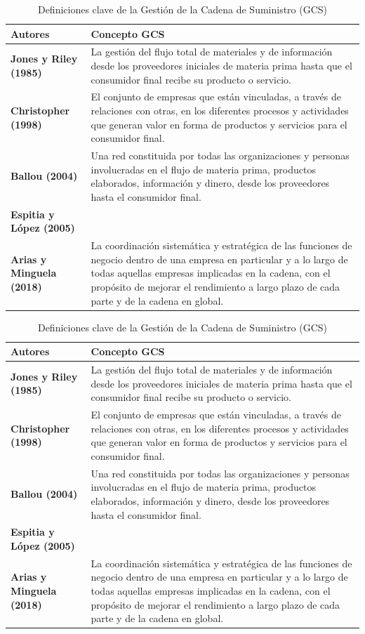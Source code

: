 \documentclass[12pt]{book} %
\begin{document}
\begin{table}[H]
\centering
\caption{Definiciones clave de la Gestión de la Cadena de Suministro (GCS)}
\begin{tabular}{|l|p{12cm}|}
\hline
\textbf{Autores} & \textbf{Concepto GCS} \\ \hline
\textbf{Jones y Riley (1985)} & La gestión del flujo total de materiales y de información desde los proveedores iniciales de materia prima hasta que el consumidor final recibe su producto o servicio. \\ \hline
\textbf{Christopher (1998)} & El conjunto de empresas que están vinculadas, a través de relaciones con otras, en los diferentes procesos y actividades que generan valor en forma de productos y servicios para el consumidor final. \\ \hline
\textbf{Ballou (2004)} & Una red constituida por todas las organizaciones y personas involucradas en el flujo de materia prima, productos elaborados, información y dinero, desde los proveedores hasta el consumidor final. \\ \hline
\textbf{Espitia y López (2005)} \\ \textbf{Arias y Minguela (2018)} & La coordinación sistemática y estratégica de las funciones de negocio dentro de una empresa en particular y a lo largo de todas aquellas empresas implicadas en la cadena, con el propósito de mejorar el rendimiento a largo plazo de cada parte y de la cadena en global. \\ \hline
\end{tabular}
\end{table}

\begin{table}[H]
\centering
\caption{Definiciones clave de la Gestión de la Cadena de Suministro (GCS)}
\begin{tabular}{|l|p{12cm}|}
\hline
\textbf{Autores} & \textbf{Concepto GCS} \\ \hline
\textbf{Jones y Riley (1985)} & La gestión del flujo total de materiales y de información desde los proveedores iniciales de materia prima hasta que el consumidor final recibe su producto o servicio. \\ \hline
\textbf{Christopher (1998)} & El conjunto de empresas que están vinculadas, a través de relaciones con otras, en los diferentes procesos y actividades que generan valor en forma de productos y servicios para el consumidor final. \\ \hline
\textbf{Ballou (2004)} & Una red constituida por todas las organizaciones y personas involucradas en el flujo de materia prima, productos elaborados, información y dinero, desde los proveedores hasta el consumidor final. \\ \hline
\textbf{Espitia y López (2005)} \\ \textbf{Arias y Minguela (2018)} & La coordinación sistemática y estratégica de las funciones de negocio dentro de una empresa en particular y a lo largo de todas aquellas empresas implicadas en la cadena, con el propósito de mejorar el rendimiento a largo plazo de cada parte y de la cadena en global. \\ \hline
\end{tabular}
\end{table}
\end{document}
